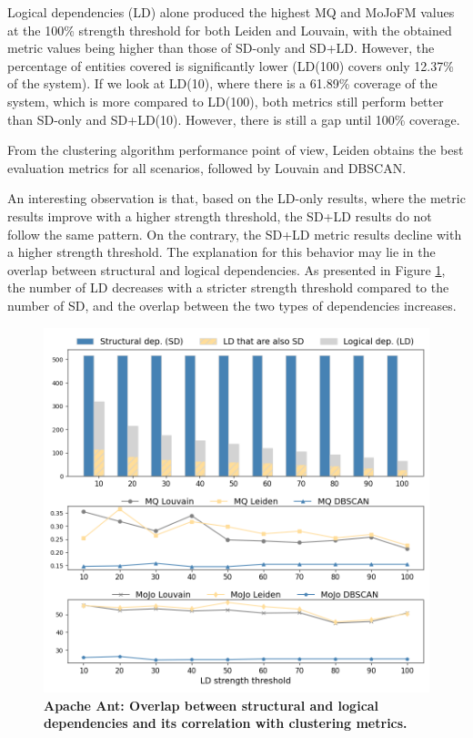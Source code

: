 \documentclass{ieeeaccess}
\begin{document}
Logical dependencies (LD) alone produced the highest MQ and MoJoFM values at the 100\% strength threshold for both Leiden and Louvain, with the obtained metric values being higher than those of SD-only and SD+LD. However, the percentage of entities covered is significantly lower (LD(100) covers only 12.37\% of the system).
If we look at LD(10), where there is a 61.89\% coverage of the system, which is more compared to LD(100), both metrics still perform better than SD-only and SD+LD(10). However, there is still a gap until 100\% coverage.

From the clustering algorithm performance point of view, Leiden obtains the best evaluation metrics for all scenarios, followed by Louvain and DBSCAN.

An interesting observation is that, based on the LD-only results, where the metric results improve with a higher strength threshold, the SD+LD results do not follow the same pattern. On the contrary, the SD+LD metric results decline with a higher strength threshold. The explanation for this behavior may lie in the overlap between structural and logical dependencies. As presented in Figure \ref{fig:ant_correlation}, the number of LD decreases with a stricter strength threshold compared to the number of SD, and the overlap between the two types of dependencies increases.


\begin{figure}[t!]
  \centering
  \includegraphics[width=\columnwidth]{ant_correlation.png}
  \caption{\textbf{Apache Ant: Overlap between structural and logical dependencies and its correlation with clustering metrics.}}
  \label{fig:ant_correlation}
\end{figure}
\end{document}
